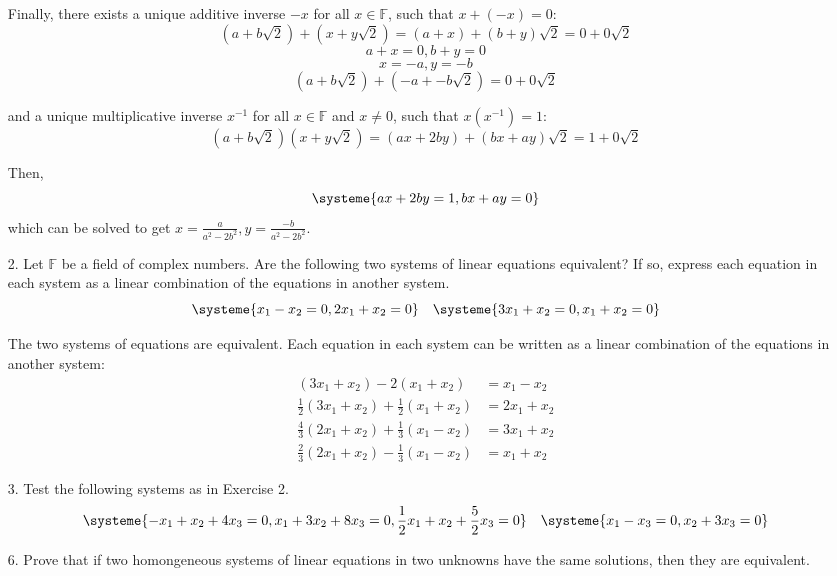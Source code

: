 \documentclass{article}
\begin{document}
\begin{enumerate}[listparindent=\parindent]
    Finally, there exists a unique additive inverse \(-x\) for all \(x \in \mathbb F\),
    such that \(x + (-x) = 0\):
    \[(a + b\sqrt{2}) + (x + y\sqrt{2}) = (a + x) + (b + y)\sqrt{2} = 0 + 0\sqrt{2}\]
    \[a + x = 0, b + y = 0\]
    \[x = -a, y = -b\]
    \[(a + b\sqrt{2}) + (-a + -b\sqrt{2}) = 0 + 0\sqrt{2}\]

    and a unique multiplicative inverse \(x^{-1}\) for all \(x \in \mathbb F\) and \(x \neq 0\),
    such that \(x(x^{-1}) = 1\):
    \[(a + b\sqrt{2})(x + y\sqrt{2}) = (ax + 2by) + (bx + ay)\sqrt{2} = 1 + 0\sqrt{2} \]

    Then,
    \[
        \systeme{
            ax + 2by = 1,
            bx + ay = 0
        }
    \]
    which can be solved to get \(x = \frac{a}{a^2 - 2b^2}, y = \frac{-b}{a^2 - 2b^2}\).

\item[2.] Let \(\mathbb F\) be a field of complex numbers. Are the following two systems of linear equations equivalent?
    If so, express each equation in each system as a linear combination of the equations in another system.
    \[
        \systeme{
            x_1 - x_2 = 0,
            2x_1 + x_2 = 0
        }
        \quad
        \systeme{
            3x_1 + x_2 = 0,
            x_1 + x_2 = 0
        }
    \]

    The two systems of equations are equivalent.
    Each equation in each system can be written as a linear combination of the equations in another system:
    \[
        \begin{alignedat}{2}
                        (3x_1+x_2) -           2 (x_1+x_2) &=  x_1-x_2 \\
            \frac{1}{2} (3x_1+x_2) + \frac{1}{2} (x_1+x_2) &= 2x_1+x_2 \\
            \frac{4}{3} (2x_1+x_2) + \frac{1}{3} (x_1-x_2) &= 3x_1+x_2 \\
            \frac{2}{3} (2x_1+x_2) - \frac{1}{3} (x_1-x_2) &=  x_1+x_2
        \end{alignedat}
    \]

\item[3.] Test the following systems as in Exercise 2.
    \[
        \systeme{
            -x_1 + x_2 + 4x_3 = 0,
            x_1 + 3x_2 + 8x_3 = 0,
            \frac{1}{2}x_1 + x_2 + \frac{5}{2}x_3 = 0
        }
        \quad
        \systeme{
            x_1 - x_3 = 0,
            x_2 + 3x_3 = 0
        }
    \]

\item[6.] Prove that if two homongeneous systems of linear equations in two unknowns have the same solutions,
    then they are equivalent.


\end{enumerate}
\end{document}
